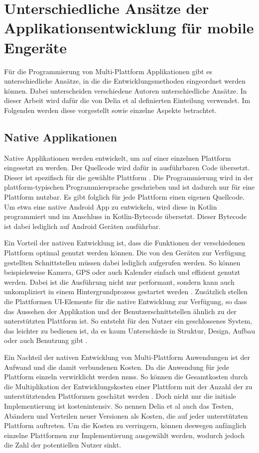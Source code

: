 \section{Unterschiedliche Ansätze der Applikationsentwicklung für mobile Engeräte}
\label{cha:3_2}
Für die Programmierung von Multi-Plattform Applikationen gibt es unterschiedliche Ansätze, in die die Entwicklungsmethoden eingeordnet werden können. Dabei unterscheiden verschiedene Autoren unterschiedliche Ansätze. In dieser Arbeit wird dafür die von Delia et al \cite{IEEE_development_classes} definierten Einteilung verwendet. Im Folgenden werden diese vorgestellt sowie einzelne Aspekte betrachtet.

\subsection{Native Applikationen}
Native Applikationen werden entwickelt, um auf einer einzelnen Plattform eingesetzt zu werden. Der Quellcode wird dafür in ausführbaren Code übersetzt. Dieser ist spezifisch für die gewählte Plattform \cite{IEEE_development_classes}.
Die Programmierung wird in der plattform-typischen Programmiersprache geschrieben und ist dadurch nur für eine Plattform nutzbar. Es gibt folglich für jede Plattform einen eigenen Quellcode. Um etwa eine native Android App zu entwickeln, wird diese in Kotlin programmiert und im Anschluss in Kotlin-Bytecode übersetzt. Dieser Bytecode ist dabei lediglich auf Android Geräten ausführbar.

Ein Vorteil der nativen Entwicklung ist, dass die Funktionen der verschiedenen Plattform optimal genutzt werden können. Die von den Geräten zur Verfügung gestellten Schnittstellen müssen dabei lediglich aufgerufen werden. So können beispielsweise Kamera, GPS oder auch Kalender einfach und effizient genutzt werden. Dabei ist die Ausführung nicht nur performant, sondern kann auch unkompliziert in einem Hintergrundprozess gestartet werden \cite{IEEE_development_classes}.
Zusätzlich stellen die Plattformen UI-Elemente für die native Entwicklung zur Verfügung, so dass das Aussehen der Applikation und der Benutzerschnittstellen ähnlich zu der unterstützten Plattform ist. So entsteht für den Nutzer ein geschlossenes System, das leichter zu bedienen ist, da es kaum Unterschiede in Struktur, Design, Aufbau oder auch Benutzung gibt \cite{IEEE_Khackouch_Al}.

Ein Nachteil der nativen Entwicklung von Multi-Plattform Anwendungen ist der Aufwand und die damit verbundenen Kosten. Da die Anwendung für jede Plattform einzeln verwirklicht werden muss. So können die Gesamtkosten durch die Multiplikation der Entwicklungskosten einer Plattform mit der Anzahl der zu unterstütztenden Plattformen geschätzt werden \cite{IEEE_Khackouch_Al}. Doch nicht nur die initiale Implementierung ist kostenintensiv. So nennen Delia et al \cite{IEEE_development_classes} auch das Testen, Abändern und Verteilen neuer Versionen als Kosten, die auf jeder unterstützten Plattform auftreten. 
Um die Kosten zu verringern, können deswegen anfänglich einzelne Plattformen zur Implementierung ausgewählt werden, wodurch jedoch die Zahl der potentiellen Nutzer sinkt.


